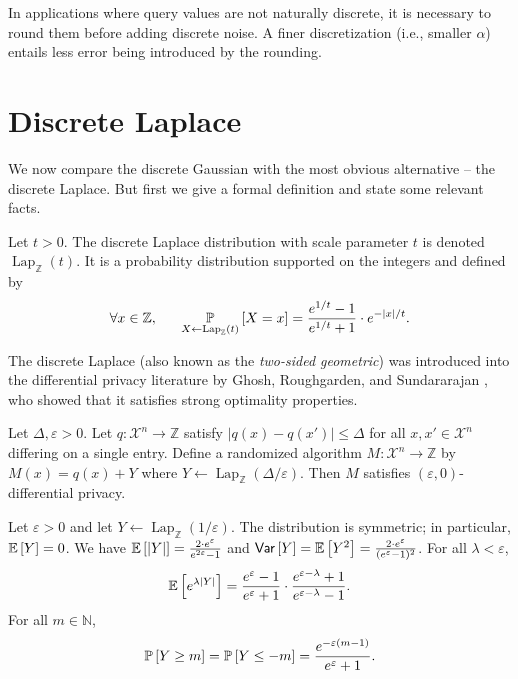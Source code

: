 \documentclass{jpc}
\newcommand{\discL}{\operatorname{Lap}_{\Z}} \newcommand{\discN}{\mathcal{N}_{\Z}}
\newcommand{\ex}[2]{{\ifx&#1& \mathbb{E} \else
\underset{#1}{\mathbb{E}} \fi \left[#2\right]}}
\newcommand{\pr}[2]{{\ifx&#1& \mathbb{P} \else
\underset{#1}{\mathbb{P}} \fi \left[#2\right]}}
\newcommand{\var}[2]{{\ifx&#1& \mathsf{Var} \else
\underset{#1}{\mathsf{Var}} \fi \left[#2\right]}}
\newcommand{\Z}{\mathbb{Z}}
\begin{document}
  
 In applications where query values are not naturally discrete, it is necessary to round them before adding discrete noise. A finer discretization (i.e., smaller $\alpha$) entails less error being introduced by the rounding.


\section{Discrete Laplace}
\label{sec:dlap}
We now compare the discrete Gaussian with the most obvious alternative -- the discrete Laplace. But first we give a formal definition and state some relevant facts.

\begin{defi}
Let $t > 0$. The discrete Laplace distribution with scale parameter $t$ is denoted $\discL(t)$. It is a probability distribution supported on the integers and defined by 
\begin{equation}
\forall x \in \Z, ~~~~~ \pr{X \gets \discL(t)}{X=x}=\frac{e^{1/t}-1}{e^{1/t}+1} \cdot e^{-|x|/t}.
\end{equation}
\end{defi}

The discrete Laplace (also known as the \emph{two-sided geometric}) was introduced into the differential privacy literature by Ghosh, Roughgarden, and Sundararajan \cite{GhoshRS12}, who showed that it satisfies strong optimality properties.

\begin{lem}
Let $\Delta,\varepsilon>0$. Let $q\colon \mathcal{X}^n \to \Z$ satisfy $|q(x)-q(x')|\le\Delta$ for all $x,x'\in\mathcal{X}^n$ differing on a single entry. Define a randomized algorithm $M\colon \mathcal{X}^n \to \Z$ by $M(x)=q(x)+Y$ where $Y \gets \discL(\Delta/\varepsilon)$. Then $M$ satisfies $(\varepsilon,0)$-differential privacy.
\end{lem}

\begin{lem}\label{lem:dlap-util}
Let $\varepsilon>0$ and let $Y \gets \discL(1/\varepsilon)$. The distribution is symmetric; in particular, $\ex{}{Y}=0$. We have $\ex{}{|Y|}=\frac{2 \cdot e^\varepsilon}{e^{2\varepsilon}-1}$ and $\var{}{Y}=\ex{}{Y^2} = \frac{2\cdot e^{\varepsilon}}{(e^{\varepsilon}-1)^2}$. For all $\lambda<\varepsilon$, $$\ex{}{e^{\lambda|Y|}} = \frac{e^{\varepsilon}-1}{e^{\varepsilon}+1} \cdot  \frac{e^{\varepsilon-\lambda}+1}{e^{\varepsilon-\lambda}-1}.$$
For all $m \in \mathbb{N}$, $$\pr{}{Y\ge m} = \pr{}{Y\le -m} = \frac{e^{-\varepsilon(m-1)}}{e^\varepsilon+1}.$$
\end{lem}
\end{document}
